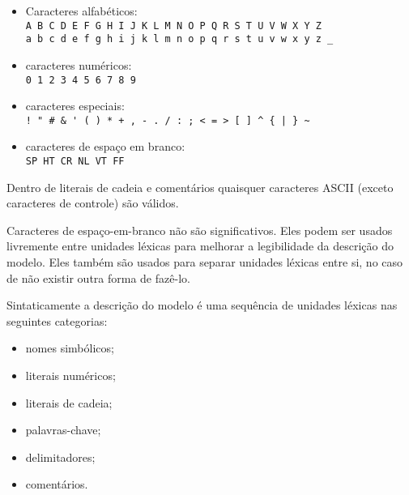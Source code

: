 \documentclass[11pt, brazil]{report}
\begin{document}

\begin{itemize}
\item Caracteres alfabéticos:\\
\verb|A B C D E F G H I J K L M N O P Q R S T U V W X Y Z|\\
\verb|a b c d e f g h i j k l m n o p q r s t u v w x y z _|
\item caracteres numéricos:\\
\verb|0 1 2 3 4 5 6 7 8 9|
\item caracteres especiais:\\
\verb?! " # & ' ( ) * + , - . / : ; < = > [ ] ^ { | } ~?
\item caracteres de espaço em branco:\\
\verb|SP HT CR NL VT FF|
\end{itemize}

Dentro de literais de cadeia e comentários quaisquer
caracteres ASCII (exceto caracteres de controle) são válidos.



Caracteres de espaço-em-branco não são significativos. Eles podem ser
usados livremente entre unidades léxicas para melhorar a legibilidade da
descrição do modelo. Eles também são usados para separar unidades léxicas
entre si, no caso de não existir outra forma de fazê-lo.


Sintaticamente a descrição do modelo é uma sequência de unidades léxicas
nas seguintes \linebreak categorias:


\begin{itemize}
\item nomes simbólicos;
\item literais numéricos;
\item literais de cadeia;
\item palavras-chave;
\item delimitadores;
\item comentários.
\end{itemize}
\end{document}
